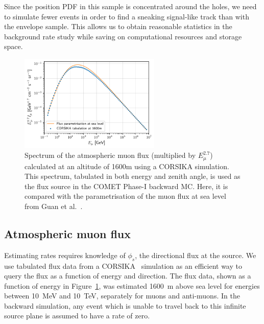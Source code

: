 Since the position PDF in this sample is concentrated around the holes, we need
to simulate fewer events in order to find a sneaking signal-like track than with
the envelope sample. This allows us to obtain reasonable statistics in the
background rate study while saving on computational resources and storage space.

\begin{figure}
    \centering
    \includegraphics[width=0.6\textwidth]{chapter5/flux_distribution.pdf}
    \caption{ Spectrum of the atmospheric muon flux (multiplied by
        $E_\mu^{2.7}$) calculated at an altitude of 1600m using a CORSIKA
        simulation. This spectrum, tabulated in both energy and zenith angle, is
        used as the flux source in the COMET Phase-I backward MC. Here, it is
        compared with the parametrisation of the muon flux at sea level from Guan
        et al.~\cite{gccly}. }
    \label{fig:corsika_flux_distribution}
\end{figure}

\subsection{Atmospheric muon flux}
Estimating rates requires knowledge of $\phi_s$, the directional flux at the
source. We use tabulated flux data from a CORSIKA~\cite{corsika} simulation as
an efficient way to query the flux as a function of energy and direction. The
flux data, shown as a function of energy in
Figure~\ref{fig:corsika_flux_distribution}, was estimated \SI{1600}{\metre}
above sea level for energies between \SI{10}{\MeV} and \SI{10}{\TeV}, separately
for muons and anti-muons. In the backward simulation, any event which is unable to
travel back to this infinite source plane is assumed to have a rate of zero.





